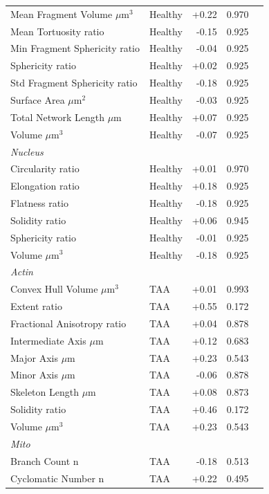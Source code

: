 \documentclass[11pt,a4paper]{article}
\begin{document}
\begin{longtable}{llrrr}
  Mean Fragment Volume $\mu$m$^{3}$ & Healthy & +0.22 & 0.970 &  \\
  Mean Tortuosity ratio & Healthy & -0.15 & 0.925 &  \\
  Min Fragment Sphericity ratio & Healthy & -0.04 & 0.925 &  \\
  Sphericity ratio & Healthy & +0.02 & 0.925 &  \\
  Std Fragment Sphericity ratio & Healthy & -0.18 & 0.925 &  \\
  Surface Area $\mu$m$^{2}$ & Healthy & -0.03 & 0.925 &  \\
  Total Network Length $\mu$m & Healthy & +0.07 & 0.925 &  \\
  Volume $\mu$m$^{3}$ & Healthy & -0.07 & 0.925 &  \\
\midrule
\multicolumn{5}{l}{\textit{Nucleus}} \\
  Circularity ratio & Healthy & +0.01 & 0.970 &  \\
  Elongation ratio & Healthy & +0.18 & 0.925 &  \\
  Flatness ratio & Healthy & -0.18 & 0.925 &  \\
  Solidity ratio & Healthy & +0.06 & 0.945 &  \\
  Sphericity ratio & Healthy & -0.01 & 0.925 &  \\
  Volume $\mu$m$^{3}$ & Healthy & -0.18 & 0.925 &  \\
\midrule
\multicolumn{5}{l}{\textit{Actin}} \\
  Convex Hull Volume $\mu$m$^{3}$ & TAA & +0.01 & 0.993 &  \\
  Extent ratio & TAA & +0.55 & 0.172 &  \\
  Fractional Anisotropy ratio & TAA & +0.04 & 0.878 &  \\
  Intermediate Axis $\mu$m & TAA & +0.12 & 0.683 &  \\
  Major Axis $\mu$m & TAA & +0.23 & 0.543 &  \\
  Minor Axis $\mu$m & TAA & -0.06 & 0.878 &  \\
  Skeleton Length $\mu$m & TAA & +0.08 & 0.873 &  \\
  Solidity ratio & TAA & +0.46 & 0.172 &  \\
  Volume $\mu$m$^{3}$ & TAA & +0.23 & 0.543 &  \\
\midrule
\multicolumn{5}{l}{\textit{Mito}} \\
  Branch Count n & TAA & -0.18 & 0.513 &  \\
  Cyclomatic Number n & TAA & +0.22 & 0.495 &  \\

\end{longtable}
\end{document}
